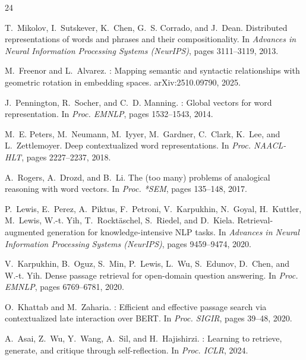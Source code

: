 \documentclass{article}
\begin{document}


\begin{thebibliography}{24}

T.~Mikolov, I.~Sutskever, K.~Chen, G.~S. Corrado, and J.~Dean.
\newblock Distributed representations of words and phrases and their compositionality.
\newblock In \emph{Advances in Neural Information Processing Systems (NeurIPS)}, pages 3111--3119, 2013.

M.~Freenor and L.~Alvarez.
: Mapping semantic and syntactic relationships with geometric rotation in embedding spaces.
\newblock arXiv:2510.09790, 2025.

J.~Pennington, R.~Socher, and C.~D. Manning.
: Global vectors for word representation.
\newblock In \emph{Proc. EMNLP}, pages 1532--1543, 2014.

M.~E. Peters, M.~Neumann, M.~Iyyer, M.~Gardner, C.~Clark, K.~Lee, and L.~Zettlemoyer.
\newblock Deep contextualized word representations.
\newblock In \emph{Proc. NAACL-HLT}, pages 2227--2237, 2018.

A.~Rogers, A.~Drozd, and B.~Li.
\newblock The (too many) problems of analogical reasoning with word vectors.
\newblock In \emph{Proc. *SEM}, pages 135--148, 2017.

P.~Lewis, E.~Perez, A.~Piktus, F.~Petroni, V.~Karpukhin, N.~Goyal, H.~Kuttler, M.~Lewis, W.-t. Yih, T.~Rockt\"{a}schel, S.~Riedel, and D.~Kiela.
\newblock Retrieval-augmented generation for knowledge-intensive {NLP} tasks.
\newblock In \emph{Advances in Neural Information Processing Systems (NeurIPS)}, pages 9459--9474, 2020.

V.~Karpukhin, B.~Oguz, S.~Min, P.~Lewis, L.~Wu, S.~Edunov, D.~Chen, and W.-t. Yih.
\newblock Dense passage retrieval for open-domain question answering.
\newblock In \emph{Proc. EMNLP}, pages 6769--6781, 2020.

O.~Khattab and M.~Zaharia.
: Efficient and effective passage search via contextualized late interaction over {BERT}.
\newblock In \emph{Proc. SIGIR}, pages 39--48, 2020.

A.~Asai, Z.~Wu, Y.~Wang, A.~Sil, and H.~Hajishirzi.
: Learning to retrieve, generate, and critique through self-reflection.
\newblock In \emph{Proc. ICLR}, 2024.


\end{thebibliography}
\end{document}
